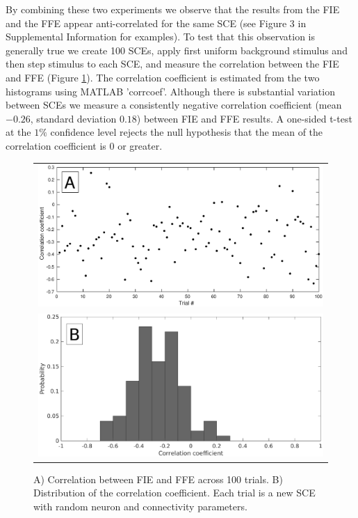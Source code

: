 \documentclass[12pt]{article}
\begin{document}
By combining these two experiments we observe that the results from the FIE and the FFE appear anti-correlated for the same SCE (see Figure 3 in Supplemental Information for examples).
To test that this observation is generally true we create 100 SCEs, apply first uniform background stimulus and then step stimulus to each SCE, and measure the correlation between the FIE and FFE (Figure \ref{fig:InitiationCorrelation}).
The correlation coefficient is estimated from the two histograms using MATLAB 'corrcoef'.  
Although there is substantial variation between SCEs we measure a consistently negative correlation coefficient (mean $-0.26$, standard deviation $0.18$) between FIE and FFE results.
A one-sided t-test at the $1\%$ confidence level rejects the null hypothesis that the mean of the correlation coefficient is $0$ or greater.
\begin{figure}[!htb]
 \centering
 \caption{ A) Correlation between FIE and FFE across 100 trials. B) Distribution of the correlation coefficient. Each trial is a new SCE with random neuron and connectivity parameters. }
 \label{fig:InitiationCorrelation}
 \begin{tabular}{c}
     \includegraphics[width=\textwidth]{fig/InitiationCorrelation} \\ 
     \includegraphics[width=\textwidth]{fig/InitiationCorrelationPDF} 
 \end{tabular}
\end{figure}
\end{document}
